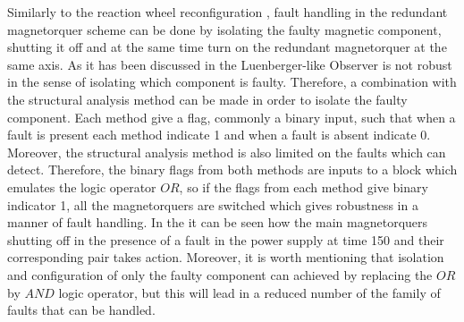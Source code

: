 Similarly to the reaction wheel reconfiguration , fault handling in the redundant magnetorquer scheme can be done by isolating the faulty magnetic component, shutting it off and at the same time turn on the redundant magnetorquer at the same axis. As it has been discussed in  the Luenberger-like Observer is not robust in the sense of isolating which component is faulty. Therefore, a combination with the structural analysis method  can be  made in order to isolate the faulty component. Each method give a flag, commonly a binary input, such that when a fault is present each method indicate 1 and when a fault is absent indicate 0. Moreover, the structural analysis method is also limited on the faults which can detect. Therefore, the binary flags from both methods are inputs to a block which emulates the logic operator $OR$, so if the flags from each method give binary indicator 1, all the magnetorquers are switched which gives robustness in a manner of fault handling. In the  it can be seen how the main magnetorquers shutting off in the presence of a fault in the power supply at time 150 and their corresponding pair takes action. Moreover, it is worth mentioning that isolation and configuration of only the faulty component can achieved by replacing the $OR$ by $AND$ logic operator, but this will lead in a reduced number of the family of faults that can be handled. 
%
%

